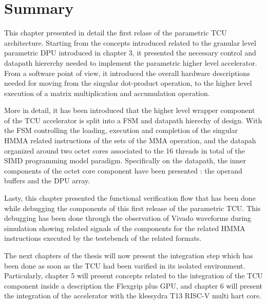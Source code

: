 \newpage
\section{Summary}

This chapter presented in detail the first relase of the parametric TCU architecture. Starting from the concepts introduced related to the granular level parametric DPU introduced in chapter 3, it presented the necessary control and datapath hiererchy needed to implement the parametric higher level accelerator. From a software point of view, it introduced the overall hardware descriptions needed for moving from the singular dot-product operation, to the higher level execution of a matrix multiplication and accumulation operation. 

More in detail, it has been introduced that the higher level wrapper component of the TCU accelerator is split into a FSM and datapath hierechy of design. With the FSM controlling the loading, execution and completion of the singular HMMA related instructions of the sets of the MMA operation, and the datapah organized around two octet cores associated to the 16 threads in total of the SIMD programming model paradigm. Specifically on the datapath, the inner components of the octet core component have been presented : the operand buffers and the DPU array.

Lasty, this chapter presented the functional verification flow that has been done while debugging the components of this first release of the parametric TCU. This debugging has been done through the observation of Vivado waveforms during simulation showing related signals of the components for the related HMMA instructions executed by the testebench of the related formats. 

The next chapters of the thesis will now present the integration step which has been done as soon as the TCU had been varified in its isolated environment. Particularly, chapter 5 will present concepts related to the integration of the TCU component inside a description the Flexgrip plus GPU, and chapter 6 will present the integration of the accelerator with the klessydra T13 RISC-V multi hart core. 